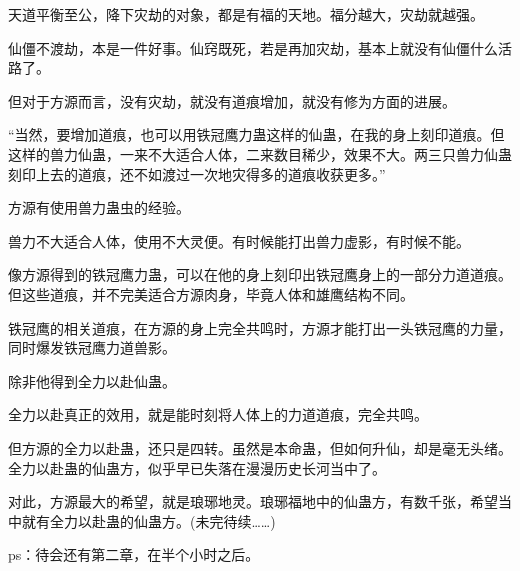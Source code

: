 \begin{this_body}
天道平衡至公，降下灾劫的对象，都是有福的天地。福分越大，灾劫就越强。

仙僵不渡劫，本是一件好事。仙窍既死，若是再加灾劫，基本上就没有仙僵什么活路了。

但对于方源而言，没有灾劫，就没有道痕增加，就没有修为方面的进展。

“当然，要增加道痕，也可以用铁冠鹰力蛊这样的仙蛊，在我的身上刻印道痕。但这样的兽力仙蛊，一来不大适合人体，二来数目稀少，效果不大。两三只兽力仙蛊刻印上去的道痕，还不如渡过一次地灾得多的道痕收获更多。”

方源有使用兽力蛊虫的经验。

兽力不大适合人体，使用不大灵便。有时候能打出兽力虚影，有时候不能。

像方源得到的铁冠鹰力蛊，可以在他的身上刻印出铁冠鹰身上的一部分力道道痕。但这些道痕，并不完美适合方源肉身，毕竟人体和雄鹰结构不同。

铁冠鹰的相关道痕，在方源的身上完全共鸣时，方源才能打出一头铁冠鹰的力量，同时爆发铁冠鹰力道兽影。

除非他得到全力以赴仙蛊。

全力以赴真正的效用，就是能时刻将人体上的力道道痕，完全共鸣。

但方源的全力以赴蛊，还只是四转。虽然是本命蛊，但如何升仙，却是毫无头绪。全力以赴蛊的仙蛊方，似乎早已失落在漫漫历史长河当中了。

对此，方源最大的希望，就是琅琊地灵。琅琊福地中的仙蛊方，有数千张，希望当中就有全力以赴蛊的仙蛊方。(未完待续……)

ps：待会还有第二章，在半个小时之后。

\end{this_body}

